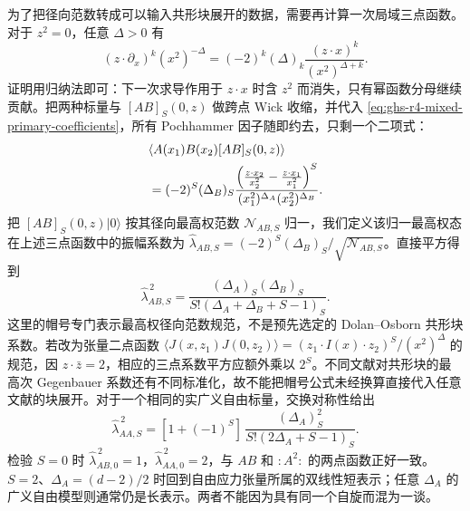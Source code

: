 为了把径向范数转成可以输入共形块展开的数据，需要再计算一次局域三点函数。对于 $z^2=0$，任意 $\Delta>0$ 有
\begin{equation}\label{eq:ghs-r4-null-derivative-power}
 (z\cdot\partial_x)^k(x^2)^{-\Delta}
 =(-2)^k(\Delta)_k\frac{(z\cdot x)^k}{(x^2)^{\Delta+k}}.
\end{equation}
证明用归纳法即可：下一次求导作用于 $z\cdot x$ 时含 $z^2$ 而消失，只有幂函数分母继续贡献。把两种标量与 $[AB]_S(0,z)$ 做跨点 Wick 收缩，并代入 \cref{eq:ghs-r4-mixed-primary-coefficients}，所有 Pochhammer 因子随即约去，只剩一个二项式：
\begin{align}\label{eq:ghs-r4-general-mixed-threepoint}
 &\langle A(x_1)B(x_2)[AB]_S(0,z)\rangle\\
 &=(-2)^S(\Delta_B)_S
 \frac{\left(\frac{z\cdot x_2}{x_2^2}-\frac{z\cdot x_1}{x_1^2}\right)^S}
 {(x_1^2)^{\Delta_A}(x_2^2)^{\Delta_B}}.
 \notag
\end{align}
把 $[AB]_S(0,z)|0\rangle$ 按其径向最高权范数 $\mathcal N_{AB,S}$ 归一，我们定义该归一最高权态在上述三点函数中的振幅系数为 $\widehat\lambda_{AB,S}=(-2)^S(\Delta_B)_S/\sqrt{\mathcal N_{AB,S}}$。直接平方得到
\begin{equation}\label{eq:ghs-r4-mft-leading-ope}
 \widehat\lambda_{AB,S}^{\,2}=\frac{(\Delta_A)_S(\Delta_B)_S}
 {S!(\Delta_A+\Delta_B+S-1)_S}.
\end{equation}
这里的帽号专门表示最高权径向范数规范，不是预先选定的 Dolan--Osborn 共形块系数。若改为张量二点函数 $\langle J(x,z_1)J(0,z_2)\rangle=(z_1\cdot I(x)\cdot z_2)^S/(x^2)^\Delta$ 的规范，因 $z\cdot\bar z=2$，相应的三点系数平方应额外乘以 $2^S$。不同文献对共形块的最高次 Gegenbauer 系数还有不同标准化，故不能把帽号公式未经换算直接代入任意文献的块展开。对于一个相同的实广义自由标量，交换对称性给出
\begin{equation}\label{eq:ghs-r4-mft-identical-ope}
 \widehat\lambda_{AA,S}^{\,2}=[1+(-1)^S]\,
 \frac{(\Delta_A)_S^2}{S!(2\Delta_A+S-1)_S}.
\end{equation}
检验 $S=0$ 时 $\widehat\lambda_{AB,0}^{\,2}=1$，$\widehat\lambda_{AA,0}^{\,2}=2$，与 $AB$ 和 $:A^2:$ 的两点函数正好一致。$S=2$、$\Delta_A=(d-2)/2$ 时回到自由应力张量所属的双线性短表示；任意 $\Delta_A$ 的广义自由模型则通常仍是长表示。两者不能因为具有同一个自旋而混为一谈。


